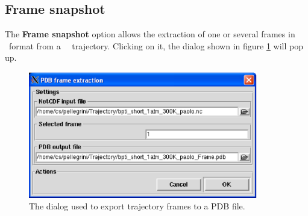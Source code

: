\documentclass[a4paper,11pt]{report}
\begin{document}
\subsection{Frame snapshot}
\label{frame_snapshot}
The \textbf{Frame snapshot} option allows the extraction of one or several frames in \PDB\ format from a \MMTK\ \NetCDF\ 
trajectory. Clicking on it, the dialog shown in figure \ref{fig:frame_snapshot} will pop up.
\begin{figure}[h!]
\begin{center}
\includegraphics[width=10cm]{Figures/frame_snapshot.eps}
\end{center}
\caption[The frame extraction dialog]{The dialog used to export trajectory frames to a PDB file.}
\label{fig:frame_snapshot}
\end{figure}   
\end{document}
